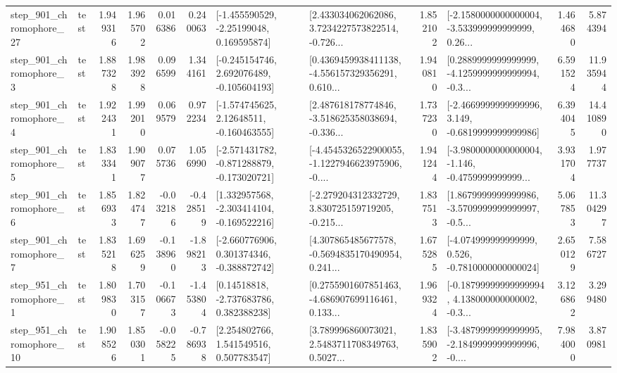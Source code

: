 \begin{tabular}{llrrrrllrlrr}
  step\_901\_chromophore\_27 &      test &      1.949316 &    1.965702 &      0.016386 &  0.240063 &    [-1.455590529, -2.25199048, 0.169595874] &  [2.433034062062086, 3.7234227573822514, -0.726... &       1.852102 &  [-2.1580000000000004, -3.533999999999999, 0.26... &            1.464680 &          5.874394 \\
   step\_901\_chromophore\_3 &      test &      1.887328 &    1.983928 &      0.096599 &  1.344161 &   [-0.245154746, 2.692076489, -0.105604193] &  [0.4369459938411138, -4.556157329356291, 0.610... &       1.940810 &  [0.2889999999999999, -4.1259999999999994, -0.3... &            6.591524 &         11.935944 \\
   step\_901\_chromophore\_4 &      test &      1.922431 &    1.992010 &      0.069579 &  0.972234 &    [-1.574745625, 2.12648511, -0.160463555] &  [2.487618178774846, -3.518625358038694, -0.336... &       1.737230 &  [-2.4669999999999996, 3.149, -0.6819999999999986] &            6.394045 &         14.410890 \\
   step\_901\_chromophore\_5 &      test &      1.833341 &    1.909077 &      0.075736 &  1.056990 &  [-2.571431782, -0.871288879, -0.173020721] &  [-4.4545326522900055, -1.1227946623975906, -0.... &       1.941244 &  [-3.9800000000000004, -1.146, -0.4759999999999... &            3.931704 &          1.977737 \\
   step\_901\_chromophore\_6 &      test &      1.856933 &    1.824747 &     -0.032186 & -0.428519 &   [1.332957568, -2.303414104, -0.169522216] &  [-2.279204312332729, 3.830725159719205, -0.215... &       1.837513 &  [1.8679999999999986, -3.5709999999999997, -0.5... &            5.067853 &         11.304297 \\
   step\_901\_chromophore\_7 &      test &      1.835218 &    1.696259 &     -0.138960 & -1.898213 &   [-2.660776906, 0.301374346, -0.388872742] &  [4.307865485677578, -0.5694835170490954, 0.241... &       1.675285 &   [-4.074999999999999, 0.526, -0.7810000000000024] &            2.650129 &          7.586727 \\
   step\_951\_chromophore\_1 &      test &      1.809830 &    1.703157 &     -0.106673 & -1.453804 &     [0.14518818, -2.737683786, 0.382388238] &  [0.2755901607851463, -4.686907699116461, 0.133... &       1.969324 &  [-0.18799999999999994, 4.138000000000002, -0.3... &            3.126862 &          3.299480 \\
  step\_951\_chromophore\_10 &      test &      1.908526 &    1.850301 &     -0.058225 & -0.786938 &     [2.254802766, 1.541549516, 0.507783547] &  [3.789996860073021, 2.5483711708349763, 0.5027... &       1.835902 &  [-3.4879999999999995, -2.1849999999999996, -0.... &            7.984000 &          3.870981 \\

\end{tabular}
